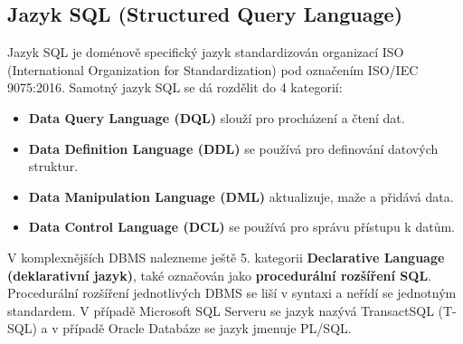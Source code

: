 \documentclass[czech,bachelor,public,dept460,male,cpdeclaration,twoside]{diploma}
\begin{document}
\subsection{Jazyk SQL (Structured Query Language)}
Jazyk SQL je doménově specifický jazyk standardizován organizací ISO (International Organization for Standardization) pod označením ISO/IEC 9075:2016. Samotný jazyk SQL se dá rozdělit do 4 kategorií:
\begin{itemize}
  \item \textbf{Data Query Language (DQL)} slouží pro procházení a čtení dat.
  \item \textbf{Data Definition Language (DDL)} se používá pro definování datových struktur.
  \item \textbf{Data Manipulation Language (DML)} aktualizuje, maže a přidává data.
  \item \textbf{Data Control Language (DCL)} se používá pro správu přístupu k datům.
\end{itemize}

V komplexnějších DBMS nalezneme ještě 5. kategorii \textbf{Declarative Language (deklarativní jazyk)}, také označován jako \textbf{procedurální rozšíření SQL}. Procedurální rozšíření jednotlivých DBMS se liší v syntaxi a neřídí se jednotným standardem. V případě Microsoft SQL Serveru se jazyk nazývá TransactSQL (T-SQL) a v případě Oracle Databáze se jazyk jmenuje PL/SQL.
\end{document}
